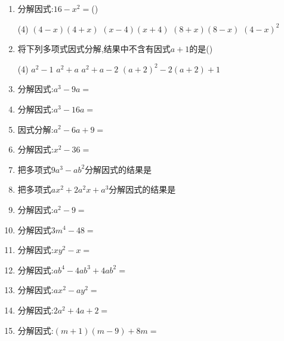 \documentclass[cn,blue]{elegantbook}
\begin{document}
\begin{problem}
\begin{enumerate}
        \item 分解因式:\(16-x^2=\)(\qquad)\\
            \begin{tasks}(4) 
                \task \((4-x)(4+x)\)
                \task \((x-4)(x+4)\)
                \task \((8+x)(8-x)\)
                \task \((4-x)^2\)
            \end{tasks}
        \item 将下列多项式因式分解,结果中不含有因式\(a+1\)的是(\qquad)\\
            \begin{tasks}(4) 
                \task \(a^2-1\)
                \task \(a^2+a\)
                \task \(a^2+a-2\)
                \task \((a+2)^2-2(a+2)+1\)
            \end{tasks}
        \item 分解因式:\(a^3-9a=\)
        \item 分解因式:\(a^3-16a=\)
        \item 因式分解:\(a^2-6a+9=\)
        \item 分解因式:\(x^2-36=\)
        \item 把多项式\(9a^3-ab^2\)分解因式的结果是
        \item 把多项式\(ax^2+2a^2x+a^3\)分解因式的结果是
        \item 分解因式:\(a^2-9=\)
        \item 分解因式\(3m^4-48=\)
        \item 分解因式:\(xy^2-x=\)
        \item 分解因式:\(ab^4-4ab^3+4ab^2=\)
        \item 分解因式:\(ax^2-ay^2=\)
        \item 分解因式:\(2a^2+4a+2=\)
        \item 分解因式:\((m+1)(m-9)+8m=\)
    \end{enumerate}
\end{problem}
\end{document}
